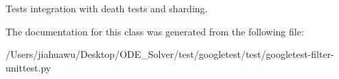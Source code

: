 \begin{DoxyVerb}Tests integration with death tests and sharding.\end{DoxyVerb}
 

The documentation for this class was generated from the following file\+:\begin{DoxyCompactItemize}
\item 
/\+Users/jiahuawu/\+Desktop/\+O\+D\+E\+\_\+\+Solver/test/googletest/test/googletest-\/filter-\/unittest.\+py\end{DoxyCompactItemize}

